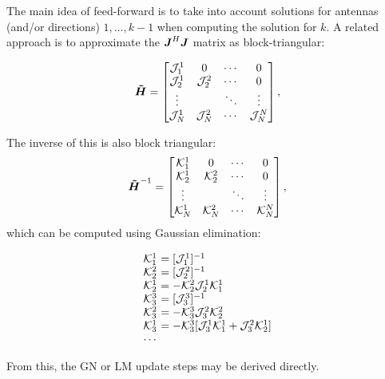 \documentclass[useAMS,usenatbib]{mn2e}
\makeatletter
\newcommand{\mat}[1]{{\bmath{#1}}}
\newcommand{\JJ}{\mat{J}} %
\newcommand{\HHa}{\mat{\tilde{H}}} %
\newcommand{\JHJ}{\JJ^H\JJ} %
\newcommand{\Matrix}[2]{\left [ \begin{array}{@{}#1@{}}#2\end{array} \right ]}
\numberwithin{equation}{section} %
\providecommand{\DIFaddbegin}{} %
\providecommand{\DIFaddend}{} %
\providecommand{\DIFdelbegin}{} %
\providecommand{\DIFdelend}{} %
\makeatother
\begin{document}
The main idea of feed-forward is to take into account solutions for antennas (and/or directions) $1,...,k-1$ when computing the
solution for $k$. A related approach is to approximate the $\JHJ$ matrix as block-triangular:
\DIFdelbegin %

\DIFdelend \begin{equation}
\label{eq:JHJ:DD:block-triag}
\HHa = \Matrix{cccc}{
\JJJ^1_1 & 0 & \cdots & 0 \\
\JJJ^1_2 & \JJJ^2_2 & \cdots & 0 \\
\vdots & & \ddots &  \vdots \\
\JJJ_{N}^1 & \JJJ_{N}^2 & \cdots & \JJJ_{N}^{N} },
\end{equation}
\DIFdelbegin %

\DIFdelend \newcommand{\KKK}{\mathcal{K}}
\DIFdelbegin %

\DIFdelend The inverse of this is also block triangular:
\begin{equation}
\label{eq:JHJ:DD:block-triag-inv}
\HHa^{-1} = \Matrix{cccc}{
\KKK^1_1 & 0 & \cdots & 0 \\
\KKK^1_2 & \KKK^2_2 & \cdots & 0 \\
\vdots & & \ddots &  \vdots \\
\KKK_{N}^1 & \KKK_{N}^2 & \cdots & \KKK_{N}^{N} },
\end{equation}
which can be computed using Gaussian elimination:
\DIFdelbegin %

\DIFdelend \DIFaddbegin \begin{equation}
\DIFaddend \begin{array}{l@{~}l}
\KKK^1_1 &= [\JJJ^1_1]^{-1} \\
\KKK^2_2 &= [\JJJ^2_2]^{-1} \\
\KKK^1_2 &= - \KKK^2_2 \JJJ^1_2 \KKK^1_1\\
\KKK^3_3 &= [\JJJ^3_3]^{-1} \\
\KKK^2_3 &= - \KKK^3_3 \JJJ^2_3 \KKK^2_2\\
\KKK^1_3 &= - \KKK^3_3 [ \JJJ^1_3 \KKK^1_1 + \JJJ^2_3 \KKK^1_2  ]\\
\cdots
\end{array}
\DIFdelbegin %
\end{equation}%

\begin{equation}%
\DIFdelend \DIFaddbegin \end{equation}
\DIFaddend From this, the GN or LM update steps may be derived directly.
\end{document}
